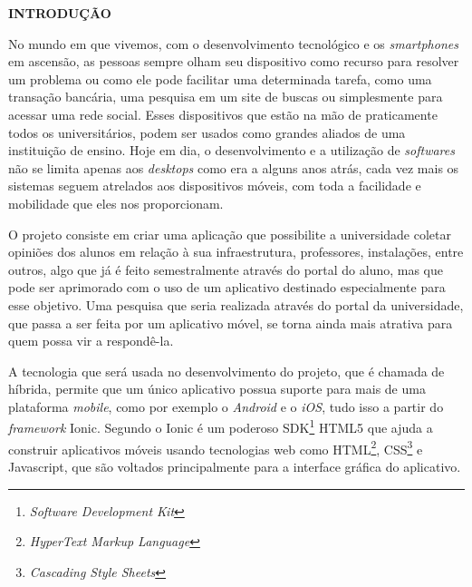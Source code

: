 \vspace{1.2em}
\textbf{\large INTRODUÇÃO}

\vspace{2.9em}


	\par No mundo em que vivemos, com o desenvolvimento tecnológico e os \textit{smartphones} em ascensão, as pessoas sempre olham seu dispositivo como recurso para resolver um problema ou como ele pode facilitar uma determinada tarefa, como uma transação bancária, uma pesquisa em um site de buscas ou simplesmente para acessar uma rede social. Esses dispositivos que estão na mão de praticamente todos os universitários, podem ser usados como grandes aliados de uma instituição de ensino. Hoje em dia, o desenvolvimento e a utilização de \textit{softwares} não se limita apenas aos \textit{desktops} como era a alguns anos atrás, cada vez mais os sistemas seguem atrelados aos dispositivos móveis, com toda a facilidade e mobilidade que eles nos proporcionam.
	
	\par O projeto consiste em criar uma aplicação que possibilite a universidade coletar opiniões dos alunos em relação à sua infraestrutura, professores, instalações, entre outros, algo que já é feito semestralmente através do portal do aluno, mas que pode ser aprimorado com o uso de um aplicativo destinado especialmente para esse objetivo. Uma pesquisa que seria realizada através do portal da universidade, que passa a ser feita por um aplicativo móvel, se torna ainda mais atrativa para quem possa vir a respondê-la. 

	\par A tecnologia que será usada no desenvolvimento do projeto, que é chamada de híbrida, permite que um único aplicativo possua suporte para mais de uma plataforma \textit{mobile}, como por exemplo o \textit{Android} e o \textit{iOS}, tudo isso a partir do \textit{framework} Ionic. Segundo  o Ionic é um poderoso SDK\footnote{\textit{Software Development Kit}} HTML5 que ajuda a construir aplicativos móveis usando tecnologias web como HTML\footnote{\textit{HyperText Markup Language}}, CSS\footnote{\textit{Cascading Style Sheets}} e Javascript, que são voltados principalmente para a interface gráfica do aplicativo.

